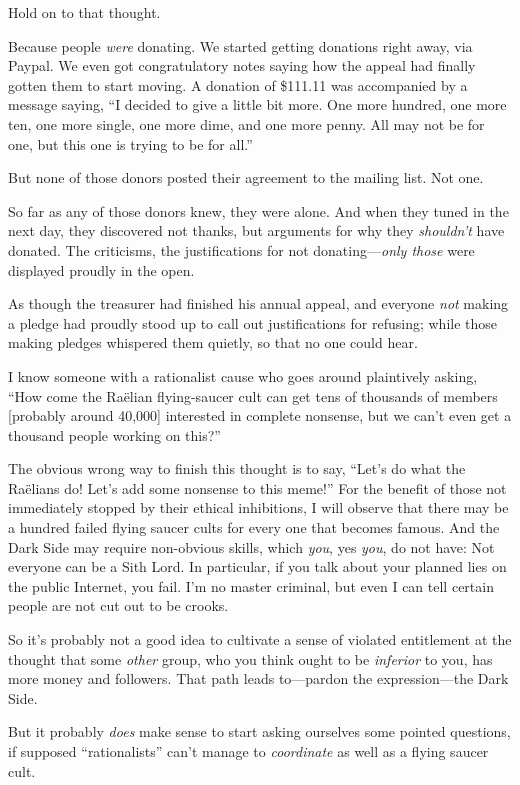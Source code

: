 {
 Hold on to that thought.}

{
 Because people \textit{were} donating. We started getting
donations right away, via Paypal. We even got congratulatory notes
saying how the appeal had finally gotten them to start moving. A
donation of \$111.11 was accompanied by a message saying,
``I decided to give a little bit more. One more
hundred, one more ten, one more single, one more dime, and one more
penny. All may not be for one, but this one is trying to be for
all.''}

{
 But none of those donors posted their agreement to the mailing
list. Not one.}

{
 So far as any of those donors knew, they were alone. And when they
tuned in the next day, they discovered not thanks, but arguments for
why they \textit{shouldn't} have donated. The
criticisms, the justifications for not donating---\textit{only those}
were displayed proudly in the open.}

{
 As though the treasurer had finished his annual appeal, and
everyone \textit{not} making a pledge had proudly stood up to call out
justifications for refusing; while those making pledges whispered them
quietly, so that no one could hear.}

{
 I know someone with a rationalist cause who goes around
plaintively asking, ``How come the Raëlian
flying-saucer cult can get tens of thousands of members [probably
around 40,000] interested in complete nonsense, but we
can't even get a thousand people working on
this?''}

{
 The obvious wrong way to finish this thought is to say,
``Let's do what the Raëlians do!
Let's add some nonsense to this
meme!'' For the benefit of those not immediately
stopped by their ethical inhibitions, I will observe that there may be
a hundred failed flying saucer cults for every one that becomes famous.
And the Dark Side may require non-obvious skills, which \textit{you},
yes \textit{you}, do not have: Not everyone can be a Sith Lord. In
particular, if you talk about your planned lies on the public Internet,
you fail. I'm no master criminal, but even I can tell
certain people are not cut out to be crooks.}

{
 So it's probably not a good idea to cultivate a
sense of violated entitlement at the thought that some \textit{other}
group, who you think ought to be \textit{inferior} to you, has more
money and followers. That path leads to---pardon the expression---the
Dark Side.}

{
 But it probably \textit{does} make sense to start asking ourselves
some pointed questions, if supposed
``rationalists''
can't manage to \textit{coordinate} as well as a flying
saucer cult.}

